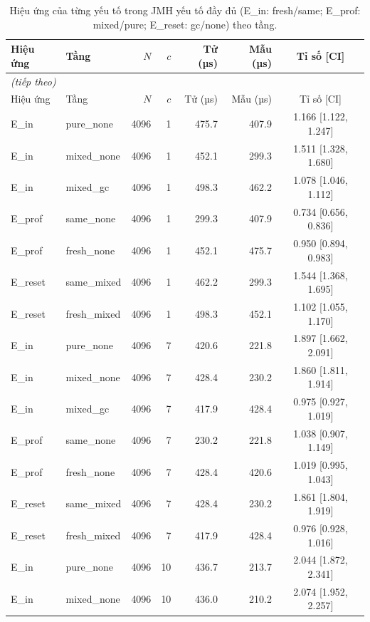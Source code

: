 \footnotesize
\begin{longtable}{llrrrrc}
\caption{Hiệu ứng của từng yếu tố trong JMH yếu tố đầy đủ (E\_in: fresh/same; E\_prof: mixed/pure; E\_reset: gc/none) theo tầng.}\label{tab:jmh_effects}\\
\toprule
Hiệu ứng & Tầng & $N$ & $c$ & Tử (µs) & Mẫu (µs) & Tỉ số [CI] \\
\midrule
\endfirsthead
\multicolumn{7}{l}{\textit{(tiếp theo)}}\\
\toprule
Hiệu ứng & Tầng & $N$ & $c$ & Tử (µs) & Mẫu (µs) & Tỉ số [CI] \\
\midrule
\endhead
\bottomrule
\endlastfoot
E\_in & pure\_none & 4096 & 1 & 475.7 & 407.9 & 1.166 [1.122, 1.247] \\
E\_in & mixed\_none & 4096 & 1 & 452.1 & 299.3 & 1.511 [1.328, 1.680] \\
E\_in & mixed\_gc & 4096 & 1 & 498.3 & 462.2 & 1.078 [1.046, 1.112] \\
E\_prof & same\_none & 4096 & 1 & 299.3 & 407.9 & 0.734 [0.656, 0.836] \\
E\_prof & fresh\_none & 4096 & 1 & 452.1 & 475.7 & 0.950 [0.894, 0.983] \\
E\_reset & same\_mixed & 4096 & 1 & 462.2 & 299.3 & 1.544 [1.368, 1.695] \\
E\_reset & fresh\_mixed & 4096 & 1 & 498.3 & 452.1 & 1.102 [1.055, 1.170] \\
E\_in & pure\_none & 4096 & 7 & 420.6 & 221.8 & 1.897 [1.662, 2.091] \\
E\_in & mixed\_none & 4096 & 7 & 428.4 & 230.2 & 1.860 [1.811, 1.914] \\
E\_in & mixed\_gc & 4096 & 7 & 417.9 & 428.4 & 0.975 [0.927, 1.019] \\
E\_prof & same\_none & 4096 & 7 & 230.2 & 221.8 & 1.038 [0.907, 1.149] \\
E\_prof & fresh\_none & 4096 & 7 & 428.4 & 420.6 & 1.019 [0.995, 1.043] \\
E\_reset & same\_mixed & 4096 & 7 & 428.4 & 230.2 & 1.861 [1.804, 1.919] \\
E\_reset & fresh\_mixed & 4096 & 7 & 417.9 & 428.4 & 0.976 [0.928, 1.016] \\
E\_in & pure\_none & 4096 & 10 & 436.7 & 213.7 & 2.044 [1.872, 2.341] \\
E\_in & mixed\_none & 4096 & 10 & 436.0 & 210.2 & 2.074 [1.952, 2.257] \\

\end{longtable}
